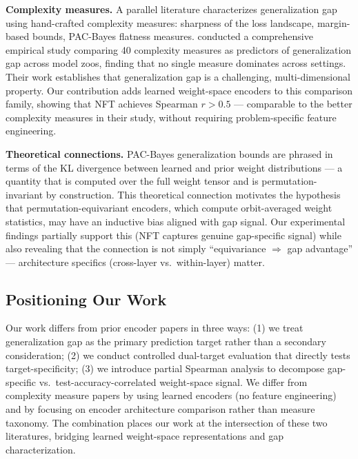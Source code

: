\textbf{Complexity measures.} A parallel literature characterizes generalization gap using hand-crafted
complexity measures: sharpness of the loss landscape, margin-based bounds, PAC-Bayes flatness measures.
\citet{jiang2019} conducted a comprehensive empirical study comparing 40 complexity measures as
predictors of generalization gap across model zoos, finding that no single measure dominates across
settings. Their work establishes that generalization gap is a challenging, multi-dimensional property.
Our contribution adds learned weight-space encoders to this comparison family, showing that NFT achieves
Spearman $r > 0.5$ --- comparable to the better complexity measures in their study, without requiring
problem-specific feature engineering.

\textbf{Theoretical connections.} PAC-Bayes generalization bounds are phrased in terms of the KL divergence
between learned and prior weight distributions --- a quantity that is computed over the full weight tensor
and is permutation-invariant by construction. This theoretical connection motivates the hypothesis that
permutation-equivariant encoders, which compute orbit-averaged weight statistics, may have an inductive
bias aligned with gap signal. Our experimental findings partially support this (NFT captures genuine
gap-specific signal) while also revealing that the connection is not simply ``equivariance $\Rightarrow$ gap advantage'' ---
architecture specifics (cross-layer vs.\ within-layer) matter.

\subsection{Positioning Our Work}

Our work differs from prior encoder papers in three ways: (1) we treat generalization gap as the primary
prediction target rather than a secondary consideration; (2) we conduct controlled dual-target evaluation
that directly tests target-specificity; (3) we introduce partial Spearman analysis to decompose
gap-specific vs.\ test-accuracy-correlated weight-space signal. We differ from complexity measure papers
by using learned encoders (no feature engineering) and by focusing on encoder architecture comparison
rather than measure taxonomy. The combination places our work at the intersection of these two literatures,
bridging learned weight-space representations and gap characterization.
